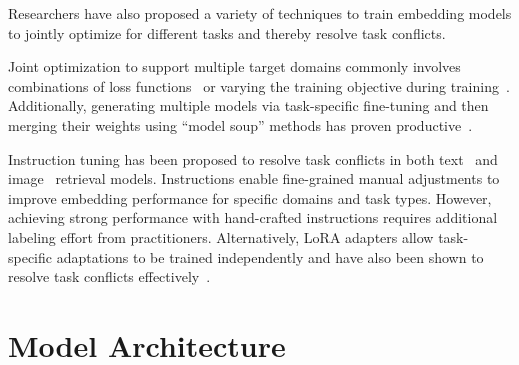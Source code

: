 \documentclass[11pt]{article}
\begin{document}
Researchers have also proposed a variety of techniques to train embedding models to jointly optimize for different tasks and thereby resolve task conflicts.

Joint optimization to support multiple target domains commonly involves combinations of loss functions~\cite{wang2014knowledge, chen-etal-2024-m3} or varying the training objective during training~\cite{mohr2024multi}. 
Additionally, generating multiple models via task-specific fine-tuning and then merging their weights using “model soup” methods has proven productive~\cite{vera2025embeddinggemma}.

Instruction tuning has been proposed to resolve task conflicts in both text~\cite{su2023one} and image~\cite{zhang2024magiclens} retrieval models.
Instructions enable fine-grained manual adjustments to improve embedding performance for specific domains and task types.
However, achieving strong performance with hand-crafted instructions requires additional labeling effort from practitioners.
Alternatively, LoRA adapters allow task-specific adaptations to be trained independently and have also been shown to resolve task conflicts effectively~\cite{sturua2025jina}.

\section{Model Architecture}
\label{sec:model-architecture}
\end{document}
